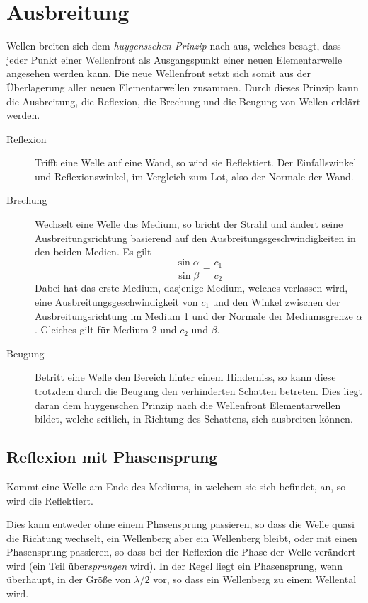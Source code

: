 \documentclass{article}
\begin{document}
\section{Ausbreitung} 
Wellen breiten sich dem \emph{huygensschen Prinzip} nach aus, welches besagt, dass jeder Punkt einer Wellenfront als Ausgangspunkt einer neuen Elementarwelle angesehen werden kann. Die neue Wellenfront setzt sich somit aus der Überlagerung aller neuen Elementarwellen zusammen. \newline
Durch dieses Prinzip kann die Ausbreitung, die Reflexion, die Brechung und die Beugung von Wellen erklärt werden.  
\begin{description} 
 \item[Reflexion] Trifft eine Welle auf eine Wand, so wird sie Reflektiert. Der Einfallswinkel und Reflexionswinkel, im Vergleich zum Lot, also der Normale der Wand.
 \item[Brechung] Wechselt eine Welle das Medium, so bricht der Strahl und ändert seine Ausbreitungsrichtung basierend auf den Ausbreitungsgeschwindigkeiten in den beiden Medien. Es gilt 
\[
 \frac{\sin \alpha}{\sin \beta} = \frac{c_1}{c_2} 
\] 
Dabei hat das erste Medium, dasjenige Medium, welches verlassen wird, eine Ausbreitungsgeschwindigkeit von $c_1$ und den Winkel zwischen der Ausbreitungsrichtung im Medium 1 und der Normale der Mediumsgrenze $\alpha$. Gleiches gilt für Medium 2 und $c_2$ und $\beta$.
  \item[Beugung] Betritt eine Welle den Bereich hinter einem Hinderniss, so kann diese trotzdem durch die Beugung den verhinderten Schatten betreten. Dies liegt daran dem huygenschen Prinzip nach die Wellenfront Elementarwellen bildet, welche seitlich, in Richtung des Schattens, sich ausbreiten können.
\end{description}  
 
\subsection{Reflexion mit Phasensprung}
Kommt eine Welle am Ende des Mediums, in welchem sie sich befindet, an, so wird die Reflektiert.
 
Dies kann entweder ohne einem Phasensprung passieren, so dass die Welle quasi die Richtung wechselt, ein Wellenberg aber ein Wellenberg bleibt, oder mit einen Phasensprung passieren, so dass bei der Reflexion die Phase der Welle verändert wird (ein Teil über\emph{sprungen} wird). In der Regel liegt ein Phasensprung, wenn überhaupt, in der Größe von $\lambda / 2$ vor, so dass ein Wellenberg zu einem Wellental wird.
 
\end{document}
